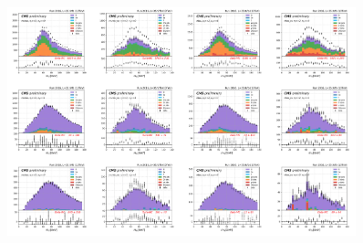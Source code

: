 \begin{figure}
    \centering
    \includegraphics[width=0.9\textwidth]{chapters/Appendix/sectionQCD/figures/ltau2.png}
    
    
    
    

\end{figure}
